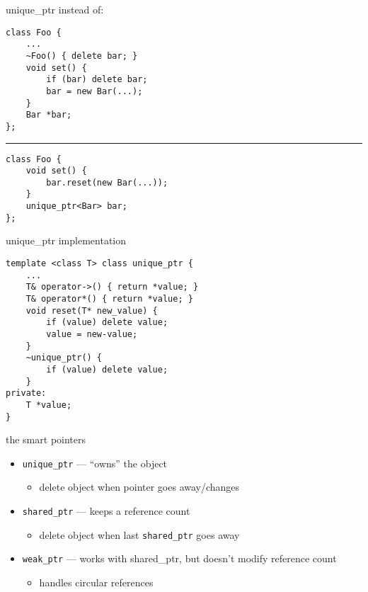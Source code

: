 \begin{frame}[fragile,label=uniquePtr]{unique\_ptr}
\lstset{language=C++,style=smaller}
instead of:
\begin{lstlisting}
class Foo {
    ...
    ~Foo() { delete bar; }
    void set() {
        if (bar) delete bar;
        bar = new Bar(...);
    }
    Bar *bar;
};
\end{lstlisting}
\hrule
\begin{lstlisting}
class Foo {
    void set() {
        bar.reset(new Bar(...));
    }
    unique_ptr<Bar> bar;
};
\end{lstlisting}
\end{frame}

\begin{frame}[fragile,label=uniquePtrImpl]{unique\_ptr implementation}
\lstset{language=C++,style=smaller}
\begin{lstlisting}
template <class T> class unique_ptr {
    ...
    T& operator->() { return *value; }
    T& operator*() { return *value; }
    void reset(T* new_value) {
        if (value) delete value;
        value = new-value;
    }
    ~unique_ptr() {
        if (value) delete value;
    }
private:
    T *value;
}
\end{lstlisting}
\end{frame}

\begin{frame}{the smart pointers}
\begin{itemize}
\item \texttt{unique\_ptr} --- ``owns'' the object
    \begin{itemize}
    \item delete object when pointer goes away/changes
    \end{itemize}
\item \texttt{shared\_ptr} --- keeps a reference count
    \begin{itemize}
    \item delete object when last \texttt{shared\_ptr} goes away
    \end{itemize}
\item \texttt{weak\_ptr} --- works with shared\_ptr, but doesn't modify reference count
    \begin{itemize}
    \item handles circular references
    \end{itemize}
\end{itemize}
\end{frame}
